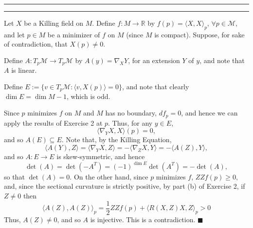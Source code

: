 \documentclass[11pt]{article}
\newcounter{questionCounter}
\newcounter{partCounter}[questionCounter]
\newenvironment{question}[2][\arabic{questionCounter}]{%
    \setcounter{partCounter}{0}%
    \vspace{.25in} \hrule \vspace{0.5em}%
        \noindent{\bf #2}%
    \vspace{0.8em} \hrule \vspace{.10in}%
    \addtocounter{questionCounter}{1}%
}{}
\renewcommand{\qed}{\quad \ensuremath{\blacksquare}}    %
\renewcommand{\dim}{\operatorname{dim}} %
\renewcommand{\det}{\operatorname{det}} %
\newcommand{\R}{\mathbb{R}}             %
\newcommand{\M}{\mathcal{M}}            %
\begin{document}
\begin{question}{Exercise 3}
Let $X$ be a Killing field on $M$. Define $f : M \to \R$ by
$f(p) = \langle X, X \rangle_p$, $\forall p \in \M$, and let $p \in M$
be a minimizer of $f$ on $M$ (since $M$ is compact). Suppose, for sake of
contradiction, that $X(p) \neq 0$.

Define $A : T_p\M \to T_p\M$ by $A(y) = \nabla_X Y$, for an extension $Y$ of
$y$, and note that $A$ is linear.

Define $E := \{v \in T_p\M : \langle v, X(p) \rangle = 0\}$, and note that
clearly $\dim E = \dim M - 1$, which is odd.

Since $p$ minimizes $f$ on $M$ and $M$ has no boundary, $df_p = 0$, and hence
we can apply the results of Exercise 2 at $p$. Thus, for any $y \in E$,
\[\langle \nabla _Y X, X \rangle (p) = 0,\]
and so $A(E) \subseteq E$. Note that, by the Killing Equation,
\[\langle A(Y), Z \rangle
    = \langle \nabla_Y X, Z \rangle
    = - \langle \nabla_Z X, Y \rangle
    = - \langle A(Z), Y \rangle,
\]
and so $A : E \to E$ is skew-symmetric, and hence
\[\det(A)
    = \det(-A^T)
    = (-1)^{\dim E} \det(A^T)
    = -\det(A),
\]
so that $\det(A) = 0$. On the other hand, since $p$ minimizes $f$,
$Z Z f(p) \geq 0$, and, since the sectional curvature is strictly positive, by
part (b) of Exercise 2, if $Z \neq 0$ then
\[\langle A(Z), A(Z) \rangle_p
    = \frac12 Z Z f(p) + \langle R(X,Z)X, Z \rangle_p
    > 0
\]
Thus, $A(Z) \neq 0$, and so $A$ is injective. This is a contradiction. \qed
\end{question}
\end{document}
